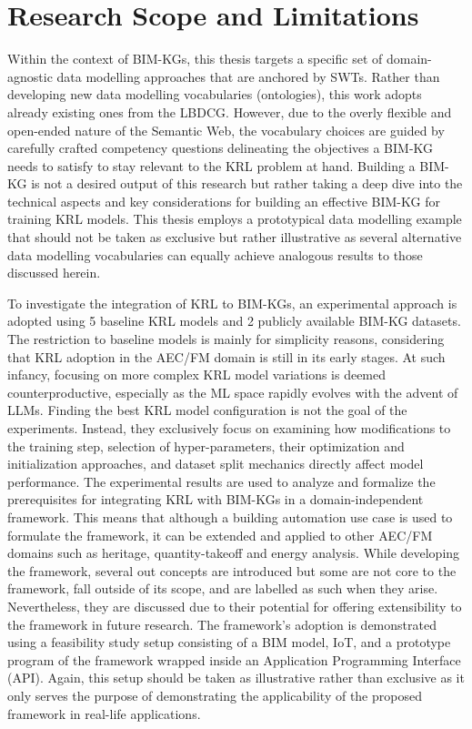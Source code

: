 \section{Research Scope and Limitations}
Within the context of \acp{BIM-KG}, this thesis targets a specific set of domain-agnostic data modelling approaches that are anchored by \acp{SWT}. Rather than developing new data modelling vocabularies (ontologies), this work adopts already existing ones from the \ac{LBDCG}. However, due to the overly flexible and open-ended nature of the Semantic Web, the vocabulary choices are guided by carefully crafted competency questions delineating the objectives a \ac{BIM-KG} needs to satisfy to stay relevant to the \ac{KRL} problem at hand. Building a \ac{BIM-KG} is not a desired output of this research but rather taking a deep dive into the technical aspects and key considerations for building an effective \ac{BIM-KG} for training \ac{KRL} models. This thesis employs a prototypical data modelling example that should not be taken as exclusive but rather illustrative as several alternative data modelling vocabularies can equally achieve analogous results to those discussed herein. 

To investigate the integration of \ac{KRL} to \acp{BIM-KG}, an experimental approach is adopted using 5 baseline \ac{KRL} models and 2 publicly available \ac{BIM-KG} datasets. The restriction to baseline models is mainly for simplicity reasons, considering that \ac{KRL} adoption in the \ac{AEC/FM} domain is still in its early stages. At such infancy, focusing on more complex \ac{KRL} model variations is deemed counterproductive, especially as the \ac{ML} space rapidly evolves with the advent of \acp{LLM}. Finding the best \ac{KRL} model configuration is not the goal of the experiments. Instead, they exclusively focus on examining how modifications to the training step, selection of hyper-parameters, their optimization and initialization approaches, and dataset split mechanics directly affect model performance. The experimental results are used to analyze and formalize the prerequisites for integrating \ac{KRL} with \acp{BIM-KG} in a domain-independent framework. This means that
although a building automation use case is used to formulate the framework, it can be extended and applied to other \ac{AEC/FM} domains such as heritage, quantity-takeoff and energy analysis. While developing the framework, several out concepts are introduced but some are not core to the framework, fall outside of its scope, and are labelled as such when they arise. Nevertheless, they are discussed due to their potential for offering extensibility to the framework in future research. The framework's adoption is demonstrated using a feasibility study setup consisting of a \ac{BIM} model, \ac{IoT}, and a prototype program of the framework wrapped inside an Application Programming Interface (API). Again, this setup should be taken as illustrative rather than exclusive as it only serves the purpose of demonstrating the applicability of the proposed framework in real-life applications.

